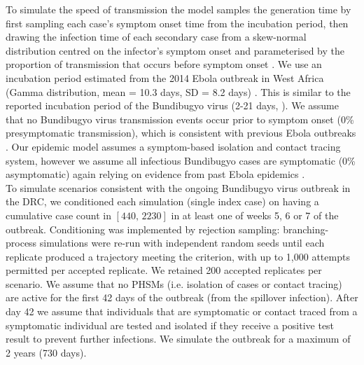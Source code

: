 \documentclass[12pt, letterpaper]{article}
\begin{document}
To simulate the speed of transmission the model samples the generation time by first sampling each case's symptom onset time from the incubation period, then drawing the infection time of each secondary case from a skew-normal distribution centred on the infector's symptom onset and parameterised by the proportion of transmission that occurs before symptom onset \citep{hellewell2020feasibility}. We use an incubation period estimated from the 2014 Ebola outbreak in West Africa (Gamma distribution, mean = 10.3 days, SD = 8.2 days) \citep{whoebolateam2015westafrica}. This is similar to the reported incubation period of the Bundibugyo virus (2-21 days, \citep{cepi2026bundibugyo}). We assume that no Bundibugyo virus transmission events occur prior to symptom onset (0\% presymptomatic transmission), which is consistent with previous Ebola outbreaks \citep{cdc2026ebolaabout}. Our epidemic model assumes a symptom-based isolation and contact tracing system, however we assume all infectious Bundibugyo cases are symptomatic (0\% asymptomatic) again relying on evidence from past Ebola epidemics \citep{mbala2017asymptomatic}. \\

To simulate scenarios consistent with the ongoing Bundibugyo virus outbreak in the DRC, we conditioned each simulation (single index case) on having a cumulative case count in $[440,\,2230]$ in at least one of weeks 5, 6 or 7 of the outbreak. Conditioning was implemented by rejection sampling: branching-process simulations were re-run with independent random seeds until each replicate produced a trajectory meeting the criterion, with up to 1{,}000 attempts permitted per accepted replicate. We retained 200 accepted replicates per scenario. We assume that no PHSMs (i.e. isolation of cases or contact tracing) are active for the first 42 days of the outbreak (from the spillover infection). After day 42 we assume that individuals that are symptomatic or contact traced from a symptomatic individual are tested and isolated if they receive a positive test result to prevent further infections. We simulate the outbreak for a maximum of 2 years (730 days). \\
\end{document}
